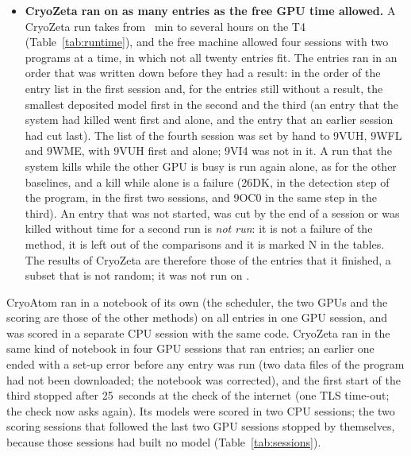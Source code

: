 \begin{itemize}
\item \textbf{CryoZeta ran on as many entries as the free GPU time allowed.} A CryoZeta run takes from \RtMinCryozeta{}~min to several hours on the T4 (Table~\ref{tab:runtime}), and the free machine allowed four sessions with two programs at a time, in which not all twenty entries fit. The entries ran in an order that was written down before they had a result: in the order of the entry list in the first session and, for the entries still without a result, the smallest deposited model first in the second and the third (an entry that the system had killed went first and alone, and the entry that an earlier session had cut last). The list of the fourth session was set by hand to 9VUH, 9WFL and 9WME, with 9VUH first and alone; 9VI4 was not in it. A run that the system kills while the other GPU is busy is run again alone, as for the other baselines, and a kill while alone is a failure (26DK, in the detection step of the program, in the first two sessions, and 9OC0 in the same step in the third). An entry that was not started, was cut by the end of a session or was killed without time for a second run is \emph{not run}: it is not a failure of the method, it is left out of the comparisons and it is marked N in the tables. The results of CryoZeta are therefore those of the \NModelCryozeta{} entries that it finished, a subset that is not random; it was not run on \NotRunListCryozeta{}.
\end{itemize}
CryoAtom ran in a notebook of its own (the scheduler, the two GPUs and the scoring are those of the other methods) on all \NEntries{} entries in one GPU session, and was scored in a separate CPU session with the same code. CryoZeta ran in the same kind of notebook in four GPU sessions that ran entries; an earlier one ended with a set-up error before any entry was run (two data files of the program had not been downloaded; the notebook was corrected), and the first start of the third stopped after 25~seconds at the check of the internet (one TLS time-out; the check now asks again). Its models were scored in two CPU sessions; the two scoring sessions that followed the last two GPU sessions stopped by themselves, because those sessions had built no model (Table~\ref{tab:sessions}).
